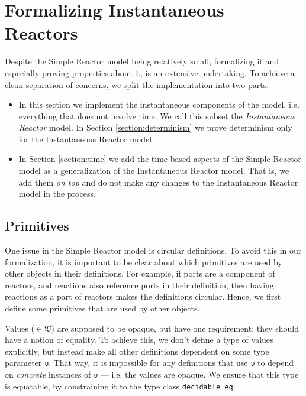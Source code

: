 \section{Formalizing Instantaneous Reactors}
\label{section:formal-inst-reactors}

Despite the Simple Reactor model being relatively small, formalizing it and especially proving properties about it, is an extensive undertaking.
To achieve a clean separation of concerns, we split the implementation into two parts:

\begin{itemize}
    \item In this section we implement the instantaneous components of the model, i.e. everything that does not involve time.
    We call this subset the \emph{Instantaneous Reactor} model.
    In Section \ref{section:determinism} we prove determinism only for the Instantaneous Reactor model.
    \item In Section \ref{section:time} we add the time-based aspects of the Simple Reactor model as a generalization of the Instantaneous Reactor model.
    That is, we add them \emph{on top} and do not make any changes to the Instantaneous Reactor model in the process.
\end{itemize}

\subsection{Primitives}

One issue in the Simple Reactor model is circular definitions. 
To avoid this in our formalization, it is important to be clear about which primitives are used by other objects in their definitions.
For example, if ports are a component of reactors, and reactions also reference ports in their definition, then having reactions as a part of reactors makes the definitions circular.
Hence, we first define some primitives that are used by other objects.

Values ($\in \mathfrak{V}$) are supposed to be opaque, but have one requirement: they should have a notion of equality.
To achieve this, we don't define a type of values explicitly, but instead make all other definitions dependent on some type parameter \lstinline{υ}.
That way, it is impossible for any definitions that use \lstinline{υ} to depend on \emph{concrete} instances of \lstinline{υ} --- i.e. the values are opaque.
We ensure that this type is equatable, by constraining it to the type class \lstinline{decidable_eq}:

